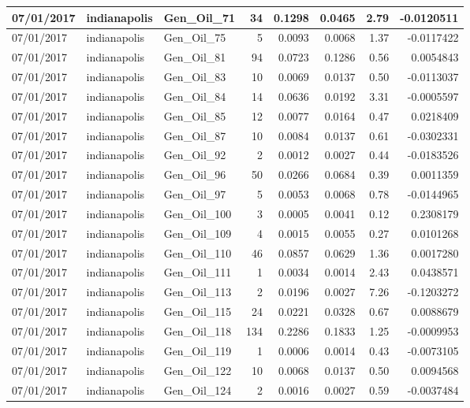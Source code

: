 \documentclass[
  letterpaper,
  DIV=11,
  numbers=noendperiod]{scrartcl}
\begin{document}
\begin{tabular}{l|l|l|r|r|r|r|r}
\hline
07/01/2017 & indianapolis & Gen\_Oil\_71 & 34 & 0.1298 & 0.0465 & 2.79 & -0.0120511\\
\hline
07/01/2017 & indianapolis & Gen\_Oil\_75 & 5 & 0.0093 & 0.0068 & 1.37 & -0.0117422\\
\hline
07/01/2017 & indianapolis & Gen\_Oil\_81 & 94 & 0.0723 & 0.1286 & 0.56 & 0.0054843\\
\hline
07/01/2017 & indianapolis & Gen\_Oil\_83 & 10 & 0.0069 & 0.0137 & 0.50 & -0.0113037\\
\hline
07/01/2017 & indianapolis & Gen\_Oil\_84 & 14 & 0.0636 & 0.0192 & 3.31 & -0.0005597\\
\hline
07/01/2017 & indianapolis & Gen\_Oil\_85 & 12 & 0.0077 & 0.0164 & 0.47 & 0.0218409\\
\hline
07/01/2017 & indianapolis & Gen\_Oil\_87 & 10 & 0.0084 & 0.0137 & 0.61 & -0.0302331\\
\hline
07/01/2017 & indianapolis & Gen\_Oil\_92 & 2 & 0.0012 & 0.0027 & 0.44 & -0.0183526\\
\hline
07/01/2017 & indianapolis & Gen\_Oil\_96 & 50 & 0.0266 & 0.0684 & 0.39 & 0.0011359\\
\hline
07/01/2017 & indianapolis & Gen\_Oil\_97 & 5 & 0.0053 & 0.0068 & 0.78 & -0.0144965\\
\hline
07/01/2017 & indianapolis & Gen\_Oil\_100 & 3 & 0.0005 & 0.0041 & 0.12 & 0.2308179\\
\hline
07/01/2017 & indianapolis & Gen\_Oil\_109 & 4 & 0.0015 & 0.0055 & 0.27 & 0.0101268\\
\hline
07/01/2017 & indianapolis & Gen\_Oil\_110 & 46 & 0.0857 & 0.0629 & 1.36 & 0.0017280\\
\hline
07/01/2017 & indianapolis & Gen\_Oil\_111 & 1 & 0.0034 & 0.0014 & 2.43 & 0.0438571\\
\hline
07/01/2017 & indianapolis & Gen\_Oil\_113 & 2 & 0.0196 & 0.0027 & 7.26 & -0.1203272\\
\hline
07/01/2017 & indianapolis & Gen\_Oil\_115 & 24 & 0.0221 & 0.0328 & 0.67 & 0.0088679\\
\hline
07/01/2017 & indianapolis & Gen\_Oil\_118 & 134 & 0.2286 & 0.1833 & 1.25 & -0.0009953\\
\hline
07/01/2017 & indianapolis & Gen\_Oil\_119 & 1 & 0.0006 & 0.0014 & 0.43 & -0.0073105\\
\hline
07/01/2017 & indianapolis & Gen\_Oil\_122 & 10 & 0.0068 & 0.0137 & 0.50 & 0.0094568\\
\hline
07/01/2017 & indianapolis & Gen\_Oil\_124 & 2 & 0.0016 & 0.0027 & 0.59 & -0.0037484\\

\end{tabular}
\end{document}

